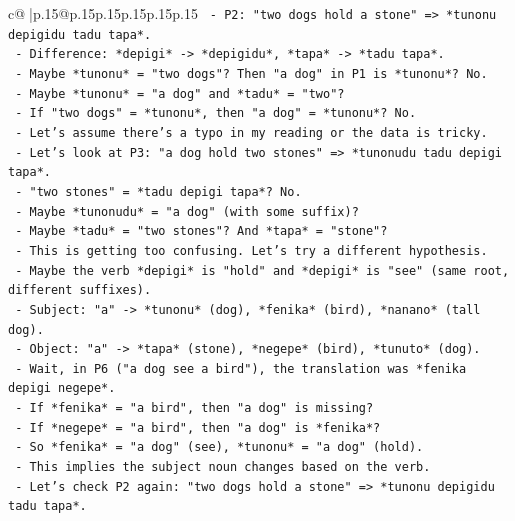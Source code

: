 \documentclass{article}
\begin{document}
{\begin{supertabular}{c@{$\;$}|p{.15\linewidth}@{}p{.15\linewidth}p{.15\linewidth}p{.15\linewidth}p{.15\linewidth}p{.15\linewidth}}
{{{\texttt{                {-} P2: "two dogs hold a stone" => *tunonu depigidu tadu tapa*.} \\
\texttt{                  {-} Difference: *depigi* {-}> *depigidu*, *tapa* {-}> *tadu tapa*.} \\
\texttt{                  {-} Maybe *tunonu* = "two dogs"? Then "a dog" in P1 is *tunonu*? No.} \\
\texttt{                  {-} Maybe *tunonu* = "a dog" and *tadu* = "two"?} \\
\texttt{                  {-} If "two dogs" = *tunonu*, then "a dog" = *tunonu*? No.} \\
\texttt{                  {-} Let's assume there's a typo in my reading or the data is tricky.} \\
\texttt{                  {-} Let's look at P3: "a dog hold two stones" => *tunonudu tadu depigi tapa*.} \\
\texttt{                    {-} "two stones" = *tadu depigi tapa*? No.} \\
\texttt{                    {-} Maybe *tunonudu* = "a dog" (with some suffix)?} \\
\texttt{                    {-} Maybe *tadu* = "two stones"? And *tapa* = "stone"?} \\
\texttt{                    {-} This is getting too confusing. Let's try a different hypothesis.} \\
\texttt{                    {-} Maybe the verb *depigi* is "hold" and *depigi* is "see" (same root, different suffixes).} \\
\texttt{                    {-} Subject: "a" {-}> *tunonu* (dog), *fenika* (bird), *nanano* (tall dog).} \\
\texttt{                    {-} Object: "a" {-}> *tapa* (stone), *negepe* (bird), *tunuto* (dog).} \\
\texttt{                    {-} Wait, in P6 ("a dog see a bird"), the translation was *fenika depigi negepe*.} \\
\texttt{                      {-} If *fenika* = "a bird", then "a dog" is missing?} \\
\texttt{                      {-} If *negepe* = "a bird", then "a dog" is *fenika*?} \\
\texttt{                      {-} So *fenika* = "a dog" (see), *tunonu* = "a dog" (hold).} \\
\texttt{                      {-} This implies the subject noun changes based on the verb.} \\
\texttt{                    {-} Let's check P2 again: "two dogs hold a stone" => *tunonu depigidu tadu tapa*.} \\
}}}
\end{supertabular}}
\end{document}
